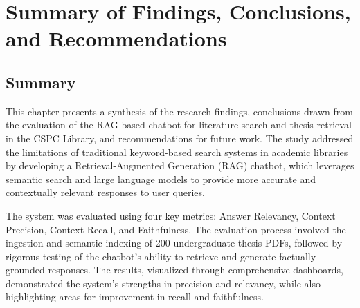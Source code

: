 \chapter{Summary of Findings, Conclusions, and Recommendations}

\section*{Summary}
This chapter presents a synthesis of the research findings, conclusions drawn from the evaluation of the RAG-based chatbot for literature search and thesis retrieval in the CSPC Library, and recommendations for future work. The study addressed the limitations of traditional keyword-based search systems in academic libraries by developing a Retrieval-Augmented Generation (RAG) chatbot, which leverages semantic search and large language models to provide more accurate and contextually relevant responses to user queries.

The system was evaluated using four key metrics: Answer Relevancy, Context Precision, Context Recall, and Faithfulness. The evaluation process involved the ingestion and semantic indexing of 200 undergraduate thesis PDFs, followed by rigorous testing of the chatbot’s ability to retrieve and generate factually grounded responses. The results, visualized through comprehensive dashboards, demonstrated the system’s strengths in precision and relevancy, while also highlighting areas for improvement in recall and faithfulness.

